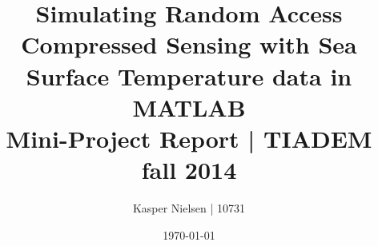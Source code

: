 \documentclass[11pt]{article}
\title{
	Simulating Random Access Compressed Sensing with Sea Surface Temperature data in MATLAB
	\\
	\vspace{5mm}
	\large{Mini-Project Report | TIADEM fall 2014}
}
\author{Kasper Nielsen | 10731}
\date{\today}
\begin{document}
\maketitle



\listoffixmes
\newpage

\tableofcontents

\newpage


\newpage


\newpage


\newpage


% 

% 

\newpage


\newpage



\newpage
\appendix

\end{document}
